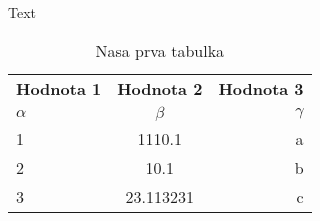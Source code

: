 \documentclass[oneside,a4paper,12pt]{article}  %
\begin{document}
Text
  

\begin{table}[h!]  %

          \begin{center}

                    \label{tab:Tabulka 1}  %
    
                    \begin{tabular}{l|c|r}  %
                              \textbf{Hodnota 1} & \textbf{Hodnota 2} & \textbf{Hodnota 3}\\   %
                              $\alpha$ & $\beta$ & $\gamma$ \\   %
                              
                              \hline  %
                              1 & 1110.1 & a\\  %
                              2 & 10.1 & b\\
                              3 & 23.113231 & c\\
               
                    \end{tabular}  %
    
          \end{center} %
                    
          \caption{Nasa prva tabulka}  %
     
\end{table}  %
\end{document}
